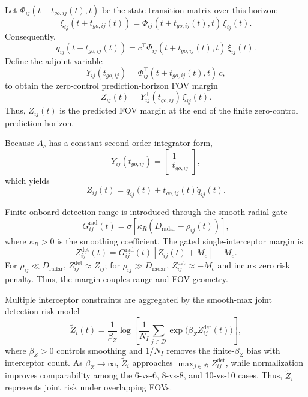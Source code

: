 \documentclass{cja}
\begin{document}
Let $\Phi_{ij}(t+t_{go,ij}(t),t)$ be the state-transition matrix over this horizon:
\begin{equation}
\xi_{ij}\!\left(t+t_{go,ij}(t)\right)=\Phi_{ij}\!\left(t+t_{go,ij}(t),t\right)\,\xi_{ij}(t).
\end{equation}
Consequently,
\begin{equation}
q_{ij}\!\left(t+t_{go,ij}(t)\right)=c^{\top}\Phi_{ij}\!\left(t+t_{go,ij}(t),t\right)\,\xi_{ij}(t).
\end{equation}
Define the adjoint variable
\begin{equation}
Y_{ij}(t_{go,ij})=\Phi_{ij}^{\top}\!\left(t+t_{go,ij}(t),t\right)\,c,
\end{equation}
to obtain the zero-control prediction-horizon FOV margin
\begin{equation}
Z_{ij}(t)=Y_{ij}^{\top}(t_{go,ij})\,\xi_{ij}(t).
\end{equation}
Thus, $Z_{ij}(t)$ is the predicted FOV margin at the end of the finite zero-control prediction horizon.

Because $A_c$ has a constant second-order integrator form,
\begin{equation}
Y_{ij}(t_{go,ij})
=
\begin{bmatrix}
1\\
t_{go,ij}
\end{bmatrix},
\end{equation}
which yields
\begin{equation}
Z_{ij}(t)
=
q_{ij}(t)+t_{go,ij}(t)\dot q_{ij}(t).
\end{equation}

Finite onboard detection range is introduced through the smooth radial gate
\begin{equation}
G_{ij}^{\mathrm{rad}}(t)
=
\sigma\!\left[\kappa_R\left(D_{\mathrm{radar}}-\rho_{ij}(t)\right)\right],
\end{equation}
where $\kappa_R>0$ is the smoothing coefficient. The gated single-interceptor margin is
\begin{equation}
Z_{ij}^{\mathrm{det}}(t)
=
G_{ij}^{\mathrm{rad}}(t)\left[Z_{ij}(t)+M_c\right]-M_c.
\end{equation}
For $\rho_{ij}\ll D_{\mathrm{radar}}$, $Z_{ij}^{\mathrm{det}}\approx Z_{ij}$; for $\rho_{ij}\gg D_{\mathrm{radar}}$, $Z_{ij}^{\mathrm{det}}\approx-M_c$ and incurs zero risk penalty. Thus, the margin couples range and FOV geometry.

Multiple interceptor constraints are aggregated by the smooth-max joint detection-risk model
\begin{equation}
\widetilde Z_i(t)
=
\frac{1}{\beta_Z}
\log\left[
\frac{1}{N_I}
\sum_{j\in\mathcal{D}}
\exp\!\bigl(\beta_Z Z_{ij}^{\mathrm{det}}(t)\bigr)
\right],
\end{equation}
where $\beta_Z>0$ controls smoothing and $1/N_I$ removes the finite-$\beta_Z$ bias with interceptor count. As $\beta_Z\to\infty$, $\widetilde Z_i$ approaches $\max_{j\in\mathcal D}Z_{ij}^{\mathrm{det}}$, while normalization improves comparability among the 6-vs-6, 8-vs-8, and 10-vs-10 cases. Thus, $\widetilde Z_i$ represents joint risk under overlapping FOVs.
\end{document}
